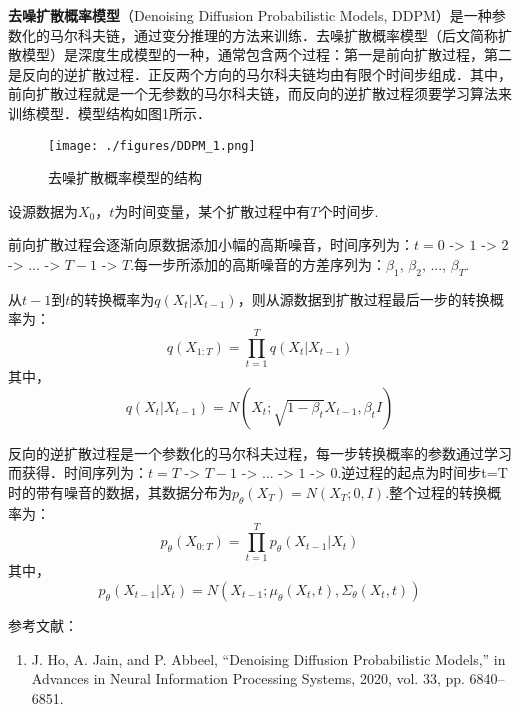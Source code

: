 
\textbf{去噪扩散概率模型}（Denoising Diffusion Probabilistic Models, DDPM）是一种参数化的马尔科夫链，通过变分推理的方法来训练．去噪扩散概率模型（后文简称扩散模型）是深度生成模型的一种，通常包含两个过程：第一是前向扩散过程，第二是反向的逆扩散过程．正反两个方向的马尔科夫链均由有限个时间步组成．其中，前向扩散过程就是一个无参数的马尔科夫链，而反向的逆扩散过程须要学习算法来训练模型．模型结构如图1所示．
\begin{figure}[ht]
\centering
\texttt{[image: ./figures/DDPM\_1.png]}
\caption{去噪扩散概率模型的结构} \label{DDPM_fig1}
\end{figure}

设源数据为$X_0$，$t$为时间变量，某个扩散过程中有$T$个时间步.

前向扩散过程会逐渐向原数据添加小幅的高斯噪音，时间序列为：$t=0$ -> $1$ -> $2$ -> ... -> $T-1$ -> $T$.每一步所添加的高斯噪音的方差序列为：$\beta_1$, $\beta_2$, ..., $\beta_T$.

从$t-1$到$t$的转换概率为$q(X_t|X_{t-1})$，则从源数据到扩散过程最后一步的转换概率为：
\begin{equation}
q(X_{1:T})=\prod_{t=1}^{T}q(X_{t}|X_{t-1})
\end{equation}
其中，
\begin{equation}
q(X_{t}|X_{t-1})=N(X_t;\sqrt{1-\beta_t}X_{t-1},\beta_tI)
\end{equation}

反向的逆扩散过程是一个参数化的马尔科夫过程，每一步转换概率的参数通过学习而获得．时间序列为：$t=T$ -> $T-1$ -> ... -> $1$ -> $0$.逆过程的起点为时间步t=T时的带有噪音的数据，其数据分布为$p_\theta(X_T)=N(X_T;0,I)$.整个过程的转换概率为：
\begin{equation}
p_{\theta}(X_{0:T})=\prod_{t=1}^{T}p_{\theta}(X_{t-1}|X_{t})
\end{equation}
其中，
\begin{equation}
p_{\theta}(X_{t-1}|X_{t})=N(X_{t-1};\mu_\theta(X_{t},t),\Sigma_\theta(X_t,t))
\end{equation}


参考文献：
\begin{enumerate}
\item J. Ho, A. Jain, and P. Abbeel, “Denoising Diffusion Probabilistic Models,” in Advances in Neural Information Processing Systems, 2020, vol. 33, pp. 6840–6851.
\end{enumerate}